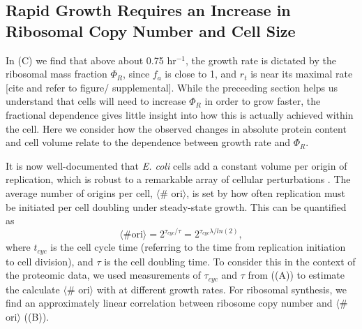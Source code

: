 \subsection{Rapid Growth Requires an Increase in Ribosomal Copy Number and Cell Size}


In (C) we find that above about 0.75 hr$^{-1}$, the growth
rate is dictated by the ribosomal mass fraction $\Phi_R$, since $f_a$ is close
to 1, and $r_t$ is near its maximal rate [cite and refer to figure/
supplemental]. While the preceeding section helps us understand that cells will
need to increase $\Phi_R$ in order to grow faster, the fractional dependence
gives little insight into how this is actually achieved within the cell. Here we
consider how the observed changes in absolute protein content and cell volume
relate to the dependence between growth rate and $\Phi_R$.

It is now well-documented that \textit{E. coli} cells add a constant volume per
origin of replication, which is robust to a remarkable array of cellular
perturbations \citep{si2017}.  The average number of origins per cell, $\langle$\#
ori$\rangle$, is set by how often replication must be initiated per cell doubling
under steady-state growth. This can be quantified as
\begin{equation}
    \langle \text{\# ori} \rangle = 2^{\tau_{cyc} / \tau} = 2^{\tau_{cyc} \lambda / ln(2)},
    \label{eq:Nori}
\end{equation}
where $t_{cyc}$ is the cell cycle time (referring to the time from replication
initiation to cell division), and $\tau$ is the cell doubling time. To consider
this  in the context of the proteomic data, we used measurements of $\tau_{cyc}$
and  $\tau$ from \cite{si2017} ((A)) to estimate
the calculate $\langle$\# ori$\rangle$  with  at different growth
rates. For ribosomal synthesis, we find an approximately linear correlation
between ribosome copy number and $\langle$\# ori$\rangle$
((B)).

